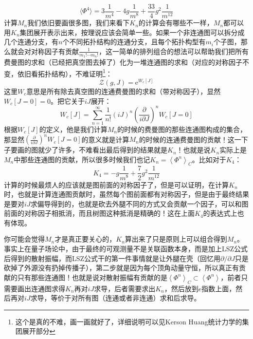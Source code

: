 \begin{equation}
	\langle\Phi^4\rangle=3\frac1{m^4}-4g\frac1{m^8}+\frac{33}4g^2\frac1{m^{12}}
\end{equation}
计算$M_n$我们依旧要画很多图，我们来看下$K_n$的计算会有哪些不一样，$M_n$都可以用$K_n$集团展开表示出来，按理说应该会简单一些。如果一个非连通图可以拆分成几个连通分支，有$n$个不同拓扑结构的连通分支，且每个拓扑构型有$m_i$个子图，那么就会对对称因子有贡献$\frac1{m_1!\cdots m_n!}$，这一简单的排列组合的想法可以帮助我们把所有费曼图的求和（已经把真空图去掉了）化为一堆连通图的求和（对应的对称因子不变，依旧看拓扑结构），不难证明\footnote{这个是真的不难，画一画就好了，详细说明可以见Kerson Huang统计力学的集团展开部分}：
\begin{equation}
	\mathcal{Z}(g,J)=\mathrm{e}^{W_c[J]}
\end{equation}
这里$W_c$意思是所有除去真空图的连通费曼图的求和（带对称因子），显然$W_c[J=0]=0$。把它关于$iJ$展开：
\begin{equation}
	W_c[J]=\sum_{n=1}^\infty \frac{1}{n!}(iJ)^n \left(\frac{\partial }{i\partial J}\right)^n W_c[J=0]
\end{equation}
根据$W_c[J]$的定义，他是我们计算$M_n$的时候的费曼图的那些连通图构成的集合，那显然$\left(\frac{\partial }{i\partial J}\right)^n W_c[J=0]$的意义就是计算$M_n$的时候的连通费曼图的贡献！这一下子要画的图就少了许多，不难看出最后得到的结果就是$K_n$！也就是说$K_n$实际上是$M_n$中那些连通图的贡献，所以很多时候我们也记$K_n=\left<\Phi^n\right>_C$。比如对于$K_4$：
\begin{equation}
	K_4=-g\frac1{m^8}+\frac72g^2\frac1{m^{12}}
\end{equation}
计算的时候最烦人的应该就是图前面的对称因子了，但是可以证明，在计算$K_n$时，也就是计算连通图贡献时，虽然每个图前面都有对称因子，但是由于最终结果是要对$iJ$求偏导得到的，也就是砍去外腿不同的方式又会贡献一个因子，可以和图前面的对称因子相抵消，而且树图这种抵消是精确的！这在上面$K_4$的表达式上也有体现。
\begin{remark}
	你可能会觉得$M_n$才是真正要关心的，$K_n$算出来了只是原则上可以组合得到$M_n$。事实上在量子场论中，由于最终的可观测量不是关联函数本身，而是加上LSZ公式后得到的散射振幅，而LSZ公式干的第一件事情就是让外腿在壳（回忆用$\partial/\partial J$只是砍掉了外源没有扔掉传播子），第二步就是因为每个顶角动量守恒，所以真正有贡献的只有那些连通图！也就是说对散射振幅有贡献的是$\left<\Phi^n\right>_C\subset\left<\Phi^n\right>$，前者只需要画出连通图求得$K_n$再对$iJ$求导，后者需要求出$K_n$，然后放到$e$指数上面，然后再对$iJ$求导，等价于对所有图（连通或者非连通）求和后求导。
\end{remark}

